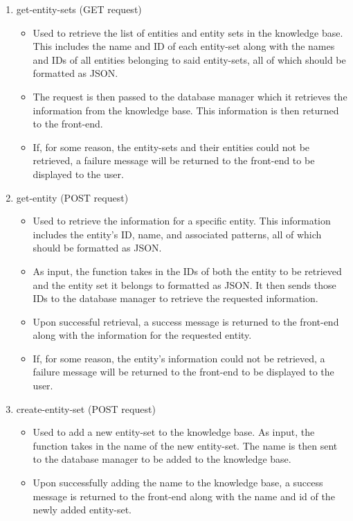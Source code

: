 \documentclass[titlepage, 12pt]{article}
\begin{document}
\begin{enumerate}
    \item get-entity-sets (GET request)
    \begin{itemize}
        \item Used to retrieve the list of entities and entity sets in the knowledge base. This includes the name and ID of each entity-set along with the names and IDs of all entities belonging to said entity-sets, all of which should be formatted as JSON.
        \item The request is then passed to the database manager which it retrieves the information from the knowledge base. This information is then returned to the front-end.
        \item If, for some reason, the entity-sets and their entities could not be retrieved, a failure message will be returned to the front-end to be displayed to the user.
    \end{itemize}
    \item get-entity (POST request)
    \begin{itemize}
        \item Used to retrieve the information for a specific entity. This information includes the entity’s ID, name, and associated patterns, all of which should be formatted as JSON.
        \item As input, the function takes in the IDs of both the entity to be retrieved and the entity set it belongs to formatted as JSON. It then sends those IDs to the database manager to retrieve the requested information.
        \item Upon successful retrieval, a success message is returned to the front-end along with the information for the requested entity.
        \item If, for some reason, the entity’s information could not be retrieved, a failure message will be returned to the front-end to be displayed to the user.
    \end{itemize}
    \item create-entity-set (POST request)
    \begin{itemize}
        \item Used to add a new entity-set to the knowledge base. As input, the function takes in the name of the new entity-set. The name is then sent to the database manager to be added to the knowledge base.
        \item Upon successfully adding the name to the knowledge base, a success message is returned to the front-end along with the name and id of the newly added entity-set.

\end{itemize}
\end{enumerate}
\end{document}
